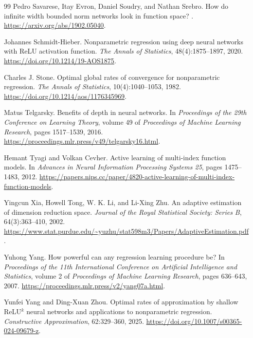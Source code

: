\documentclass[11pt,twoside]{article}
\theoremstyle{definition}
\theoremstyle{remark}
\begin{document}
\begin{thebibliography}{99}
Pedro Savarese, Itay Evron, Daniel Soudry, and Nathan Srebro.
\newblock How do infinite width bounded norm networks look in function space?
.
\newblock \url{https://arxiv.org/abs/1902.05040}.

Johannes Schmidt-Hieber.
\newblock Nonparametric regression using deep neural networks with ReLU
activation function.
\newblock \emph{The Annals of Statistics}, 48(4):1875--1897, 2020.
\newblock \url{https://doi.org/10.1214/19-AOS1875}.

Charles J. Stone.
\newblock Optimal global rates of convergence for nonparametric regression.
\newblock \emph{The Annals of Statistics}, 10(4):1040--1053, 1982.
\newblock \url{https://doi.org/10.1214/aos/1176345969}.

Matus Telgarsky.
\newblock Benefits of depth in neural networks.
\newblock In \emph{Proceedings of the 29th Conference on Learning Theory},
volume 49 of \emph{Proceedings of Machine Learning Research}, pages
1517--1539, 2016.
\newblock \url{https://proceedings.mlr.press/v49/telgarsky16.html}.

Hemant Tyagi and Volkan Cevher.
\newblock Active learning of multi-index function models.
\newblock In \emph{Advances in Neural Information Processing Systems 25},
pages 1475--1483, 2012.
\newblock \url{https://papers.nips.cc/paper/4820-active-learning-of-multi-index-function-models}.

Yingcun Xia, Howell Tong, W. K. Li, and Li-Xing Zhu.
\newblock An adaptive estimation of dimension reduction space.
\newblock \emph{Journal of the Royal Statistical Society: Series B},
64(3):363--410, 2002.
\newblock \url{https://www.stat.purdue.edu/~yuzhu/stat598m3/Papers/AdaptiveEstimation.pdf}.

Yuhong Yang.
\newblock How powerful can any regression learning procedure be?
\newblock In \emph{Proceedings of the 11th International Conference on
Artificial Intelligence and Statistics}, volume 2 of \emph{Proceedings of
Machine Learning Research}, pages 636--643, 2007.
\newblock \url{https://proceedings.mlr.press/v2/yang07a.html}.

Yunfei Yang and Ding-Xuan Zhou.
\newblock Optimal rates of approximation by shallow ReLU$^k$ neural
networks and applications to nonparametric regression.
\newblock \emph{Constructive Approximation}, 62:329--360, 2025.
\newblock \url{https://doi.org/10.1007/s00365-024-09679-z}.

\end{thebibliography}
\end{document}
